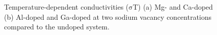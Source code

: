 \documentclass[12pt]{report}
\begin{document}
\begin{figure}[!ht]
\centering
    
    \caption{Temperature-dependent  conductivities ($\mathrm{\sigma}$T) (a) Mg- and Ca-doped (b) Al-doped and Ga-doped  at two sodium vacancy concentrations compared to the undoped system.}
    \label{conductivity}
\end{figure}

\clearpage
\end{document}

